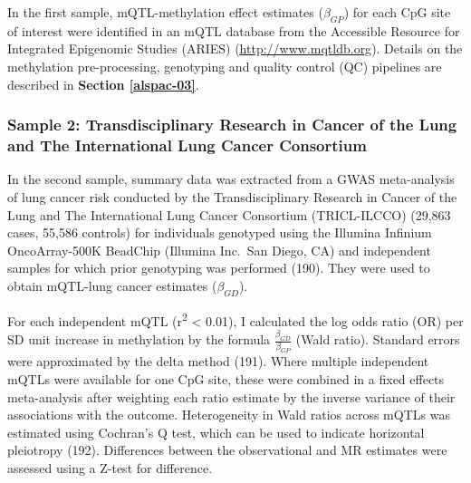 \documentclass[11pt,oneside]{bristolthesis}
\begin{document}
In the first sample, mQTL-methylation effect estimates (\(\beta_{GP}\)) for each CpG site of interest were identified in an mQTL database from the Accessible Resource for Integrated Epigenomic Studies (ARIES) (\url{http://www.mqtldb.org}). Details on the methylation pre-processing, genotyping and quality control (QC) pipelines are described in \textbf{Section \ref{alspac-03}}.

\hypertarget{sample-2-transdisciplinary-research-in-cancer-of-the-lung-and-the-international-lung-cancer-consortium}{%
\subsubsection{Sample 2: Transdisciplinary Research in Cancer of the Lung and The International Lung Cancer Consortium}\label{sample-2-transdisciplinary-research-in-cancer-of-the-lung-and-the-international-lung-cancer-consortium}}

In the second sample, summary data was extracted from a GWAS meta-analysis of lung cancer risk conducted by the Transdisciplinary Research in Cancer of the Lung and The International Lung Cancer Consortium (TRICL-ILCCO) (29,863 cases, 55,586 controls) for individuals genotyped using the Illumina Infinium OncoArray-500K BeadChip (Illumina Inc.~San Diego, CA) and independent samples for which prior genotyping was performed (190). They were used to obtain mQTL-lung cancer estimates (\(\beta_{GD}\)).

For each independent mQTL (r\textsuperscript{2} \textless{} 0.01), I calculated the log odds ratio (OR) per SD unit increase in methylation by the formula \(\frac{\beta_{GD}} {\beta_{GP}}\) (Wald ratio). Standard errors were approximated by the delta method (191). Where multiple independent mQTLs were available for one CpG site, these were combined in a fixed effects meta-analysis after weighting each ratio estimate by the inverse variance of their associations with the outcome. Heterogeneity in Wald ratios across mQTLs was estimated using Cochran's Q test, which can be used to indicate horizontal pleiotropy (192). Differences between the observational and MR estimates were assessed using a Z-test for difference.
\end{document}
